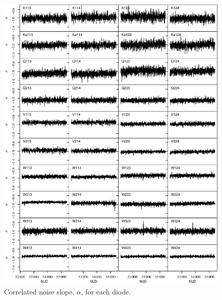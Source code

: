\documentclass[twocolumn]{../../common/aa}
\begin{document}
\begin{figure}[p]
	\centering
	\includegraphics[width=\textwidth]{figures/instpar_CG_alpha_v1.pdf}
	\caption{Correlated noise slope, $\alpha$, for each diode.}
	\label{fig:alpha}
\end{figure}
\end{document}
